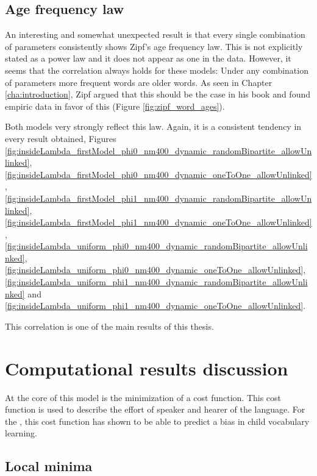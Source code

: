 \subsection{Age frequency law}
\label{sec:discussion_math_age-freq}

An interesting and somewhat unexpected result is that every single combination of parameters consistently shows Zipf's age frequency law.
This is not explicitly stated as a power law and it does not appear as one in the data.
However, it seems that the correlation always holds for these models: Under any combination of parameters more frequent words are older words.
As seen in Chapter \ref{cha:introduction}, Zipf argued that this should be the case in his book \cite{Zipf1949a} and found empiric data in favor of this (Figure \ref{fig:zipf_word_ages}).

Both models very strongly reflect this law.
Again, it is a consistent tendency in every result obtained, Figures \ref{fig:insideLambda_firstModel_phi0_nm400_dynamic_randomBipartite_allowUnlinked},  \ref{fig:insideLambda_firstModel_phi0_nm400_dynamic_oneToOne_allowUnlinked},  \ref{fig:insideLambda_firstModel_phi1_nm400_dynamic_randomBipartite_allowUnlinked},  \ref{fig:insideLambda_firstModel_phi1_nm400_dynamic_oneToOne_allowUnlinked},  \ref{fig:insideLambda_uniform_phi0_nm400_dynamic_randomBipartite_allowUnlinked},  \ref{fig:insideLambda_uniform_phi0_nm400_dynamic_oneToOne_allowUnlinked},  \ref{fig:insideLambda_uniform_phi1_nm400_dynamic_randomBipartite_allowUnlinked} and \ref{fig:insideLambda_uniform_phi1_nm400_dynamic_oneToOne_allowUnlinked}.

This correlation is one of the main results of this thesis.

\section{Computational results discussion}
\label{sec:discussion_comp}

At the core of this model is the minimization of a cost function.
This cost function is used to describe the effort of speaker and hearer of the language.
For the \firstmodel{}, this cost function has shown to be able to predict a bias in child vocabulary learning. \cite{Ferrer2017a} \cite{Carrera2021a}

\subsection{Local minima}
\label{sec:discussion_comp_minima}

